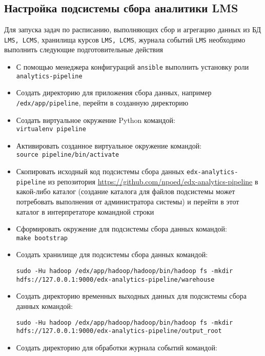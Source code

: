 \subsection{Настройка подсистемы сбора аналитики LMS}
Для запуска задач по расписанию, выполняющих сбор и агрегацию данных из БД \texttt{LMS, LCMS}, хранилища курсов \texttt{LMS, LCMS}, журнала событий \texttt{LMS} необходимо выполнить следующие подготовительные действия
\begin{itemize}
	\item С помощью менеджера конфигураций \texttt{ansible} выполнить установку роли \texttt{analytics-pipeline}
	\item Создать директорию для приложения сбора данных, например \texttt{/edx/app/pipeline}, перейти в созданную директорию
	\item Создать виртуальное окружение Python командой:\\
		\texttt{virtualenv pipeline}
	\item Активировать созданное виртуальное окружение командой:\\
		\texttt{source pipeline/bin/activate}
	\item Скопировать исходный код подсистемы сбора данных \texttt{edx-analytics-pipeline} из репозитория \url{https://github.com/npoed/edx-analytics-pipeline} в какой-либо каталог (создание каталога для файлов подсистемы может потребовать выполнения от администратора системы) и перейти в этот каталог в интерпретаторе командной строки
	\item Сформировать окружение для подсистемы сбора данных командой:\\
		\texttt{make bootstrap}
	\item Создать хранилище для подсистемы сбора данных командой:\\
	\begin{sloppypar}
		\texttt{sudo -Hu hadoop /edx/app/hadoop/hadoop/bin/hadoop fs -mkdir hdfs://127.0.0.1:9000/edx-analytics-pipeline/warehouse}		
	\end{sloppypar}
	\item Создать директорию временных выходных данных для подсистемы сбора данных командой:\\
	\begin{sloppypar}
		\texttt{sudo -Hu hadoop /edx/app/hadoop/hadoop/bin/hadoop fs -mkdir hdfs://127.0.0.1:9000/edx-analytics-pipeline/output\_root}		
	\end{sloppypar}
	\item Создать директорию для обработки журнала событий командой:\\

\end{itemize}
